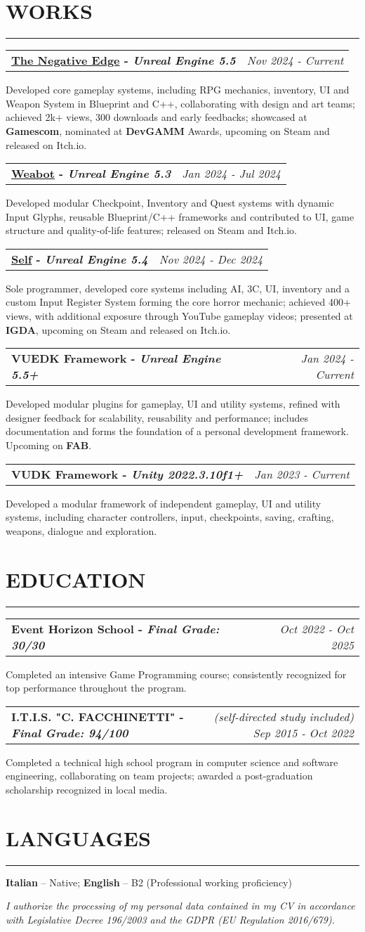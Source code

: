 \documentclass[7pt]{article}
\makeatletter
\newcommand{\sectionline}{\vspace{-0.3em}\noindent\rule{\linewidth}{0.15pt}\vspace{0.08em}}
\newcommand{\project}[3]{%
    \noindent
    \begin{tabular*}{\textwidth}{@{\extracolsep{\fill}} l r}
    \textbf{#1} & \textit{#2} \\
    \end{tabular*}
    \vspace{0.04em}
    #3
    \vspace{0.08em}\par
}
\newcommand{\cvsection}[2]{%
    \vspace{-.6em}
    \section*{{\large\textbf{\MakeUppercase{#1}}}}
    \vspace{-0.5em}
    \sectionline
    \vspace{-0.15em}
    #2
}
\newcommand{\footerdescription}[1]{%
    \vspace{-0.25em}
    \begin{center}
    \scriptsize
    \setlength{\parskip}{0pt}
    \setlength{\parindent}{0pt}
    \textit{#1}
    \end{center}
    \vspace{-0.25em}
}
\makeatother
\begin{document}
    \cvsection{WORKS}{
        \project{\href{https://eventhorizonschool.itch.io/the-negative-edge}{The Negative Edge} - \textit{Unreal Engine 5.5}}{Nov 2024 - Current}{
            Developed core gameplay systems, including RPG mechanics, inventory, UI and Weapon System in Blueprint and C++, collaborating with design and art teams;
            achieved 2k+ views, 300 downloads and early feedbacks;
            showcased at \textbf{Gamescom}, nominated at \textbf{DevGAMM} Awards, upcoming on Steam and released on Itch.io.
        }
        \project{\href{https://store.steampowered.com/app/4075260/Weabot/}{Weabot} - \textit{Unreal Engine 5.3}}{Jan 2024 - Jul 2024}{
            Developed modular Checkpoint, Inventory and Quest systems with dynamic Input Glyphs, reusable Blueprint/C++ frameworks and contributed to UI, game structure and quality-of-life features;
            released on Steam and Itch.io.
        }
        \project{\href{https://jacedxxm.itch.io/self}{Self} - \textit{Unreal Engine 5.4}}{Nov 2024 - Dec 2024}{
            Sole programmer, developed core systems including AI, 3C, UI, inventory and a custom Input Register System forming the core horror mechanic;
            achieved 400+ views, with additional exposure through YouTube gameplay videos; presented at \textbf{IGDA}, upcoming on Steam and released on Itch.io.
        }
        \project{VUEDK Framework - \textit{Unreal Engine 5.5+}}{Jan 2024 - Current}{
            Developed modular plugins for gameplay, UI and utility systems, refined with designer feedback for scalability, reusability and performance;
            includes documentation and forms the foundation of a personal development framework. Upcoming on \textbf{FAB}.
        }
        \project{VUDK Framework - \textit{Unity 2022.3.10f1+}}{Jan 2023 - Current}{
            Developed a modular framework of independent gameplay, UI and utility systems, including character controllers, input, checkpoints, saving, crafting, weapons, dialogue and exploration.
        }
    }

    \cvsection{EDUCATION}{
        \project{Event Horizon School - \textit{Final Grade: 30/30}}{Oct 2022 - Oct 2025}{
            Completed an intensive Game Programming course;
            consistently recognized for top performance throughout the program.
        }
        \project{I.T.I.S. "C. FACCHINETTI" - \textit{Final Grade: 94/100}}{(self-directed study included) Sep 2015 - Oct 2022}{
            Completed a technical high school program in computer science and software engineering, collaborating on team projects;
            awarded a post-graduation scholarship recognized in local media.
        }
    }

    \cvsection{LANGUAGES}{
        \textbf{Italian} – Native; \textbf{English} – B2 (Professional working proficiency)
    }

    \footerdescription{
        I authorize the processing of my personal data contained in my CV in accordance with Legislative Decree 196/2003 and the GDPR (EU Regulation 2016/679).
    }
\end{document}
